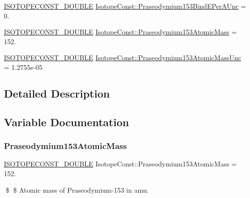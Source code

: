 \begin{DoxyCompactItemize}
\item 
\mbox{\hyperlink{group___isotope_const-_macros_ga8f45a7272ce02c0b4c65c44636ed719a}{I\+S\+O\+T\+O\+P\+E\+C\+O\+N\+S\+T\+\_\+\+D\+O\+U\+B\+LE}} \mbox{\hyperlink{group___isotope_const-_praseodymium-_pr153_gaae16fe13749219f441ed118a1afbacf3}{Isotope\+Const\+::\+Praseodymium153\+Bind\+E\+Per\+A\+Unc}} = 0.
\item 
\mbox{\hyperlink{group___isotope_const-_macros_ga8f45a7272ce02c0b4c65c44636ed719a}{I\+S\+O\+T\+O\+P\+E\+C\+O\+N\+S\+T\+\_\+\+D\+O\+U\+B\+LE}} \mbox{\hyperlink{group___isotope_const-_praseodymium-_pr153_gaa29b5f372e1a94cf00c41eb23e755b28}{Isotope\+Const\+::\+Praseodymium153\+Atomic\+Mass}} = 152.
\item 
\mbox{\hyperlink{group___isotope_const-_macros_ga8f45a7272ce02c0b4c65c44636ed719a}{I\+S\+O\+T\+O\+P\+E\+C\+O\+N\+S\+T\+\_\+\+D\+O\+U\+B\+LE}} \mbox{\hyperlink{group___isotope_const-_praseodymium-_pr153_gab9b74f85a922287096d4ccf49c2010a6}{Isotope\+Const\+::\+Praseodymium153\+Atomic\+Mass\+Unc}} = 1.\+2755e-\/05
\end{DoxyCompactItemize}


\subsection{Detailed Description}


\subsection{Variable Documentation}
\mbox{\label{group___isotope_const-_praseodymium-_pr153_gaa29b5f372e1a94cf00c41eb23e755b28}} 
\subsubsection{\texorpdfstring{Praseodymium153\+Atomic\+Mass}{Praseodymium153AtomicMass}}
{\footnotesize\ttfamily \mbox{\hyperlink{group___isotope_const-_macros_ga8f45a7272ce02c0b4c65c44636ed719a}{I\+S\+O\+T\+O\+P\+E\+C\+O\+N\+S\+T\+\_\+\+D\+O\+U\+B\+LE}} Isotope\+Const\+::\+Praseodymium153\+Atomic\+Mass = 152.}

\$ \$ Atomic mass of Praseodymium-\/153 in amu. \mbox{\label{group___isotope_const-_praseodymium-_pr153_gab9b74f85a922287096d4ccf49c2010a6}} 
